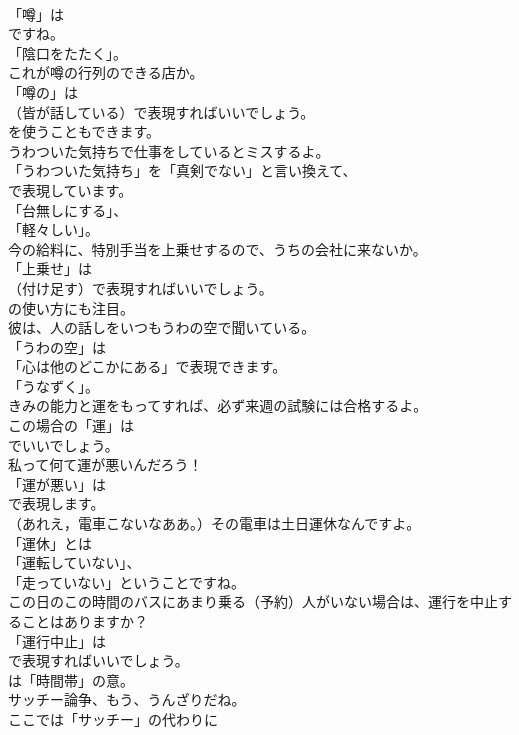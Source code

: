\documentclass[8pt]{extreport}
\begin{document}
\begin{CJK}{UTF8}{min}
\\	「噂」は
\\	ですね。
\\	「陰口をたたく」。	
\\	これが噂の行列のできる店か。 
\\	「噂の」は 
\\	（皆が話している）で表現すればいいでしょう。
\\	を使うこともできます。	
\\	うわついた気持ちで仕事をしているとミスするよ。 
\\	「うわついた気持ち」を「真剣でない」と言い換えて、
\\	で表現しています。
\\	「台無しにする」、
\\	「軽々しい」。	
\\	今の給料に、特別手当を上乗せするので、うちの会社に来ないか。 
\\	「上乗せ」は 
\\	（付け足す）で表現すればいいでしょう。
\\	の使い方にも注目。	
\\	彼は、人の話しをいつもうわの空で聞いている。 
\\	「うわの空」は
\\	「心は他のどこかにある」で表現できます。
\\	「うなずく」。	
\\	きみの能力と運をもってすれば、必ず来週の試験には合格するよ。 
\\	この場合の「運」は 
\\	でいいでしょう。	
\\	私って何て運が悪いんだろう！ 
\\	「運が悪い」は 
\\	で表現します。	
\\	（あれえ，電車こないなああ。）その電車は土日運休なんですよ。 
\\	「運休」とは
\\	「運転していない」、
\\	「走っていない」ということですね。	
\\	この日のこの時間のバスにあまり乗る（予約）人がいない場合は、運行を中止することはありますか？ 
\\	「運行中止」は 
\\	で表現すればいいでしょう。
\\	は「時間帯」の意。	
\\	サッチー論争、もう、うんざりだね。 
\\	ここでは「サッチー」の代わりに

\end{CJK}
\end{document}
